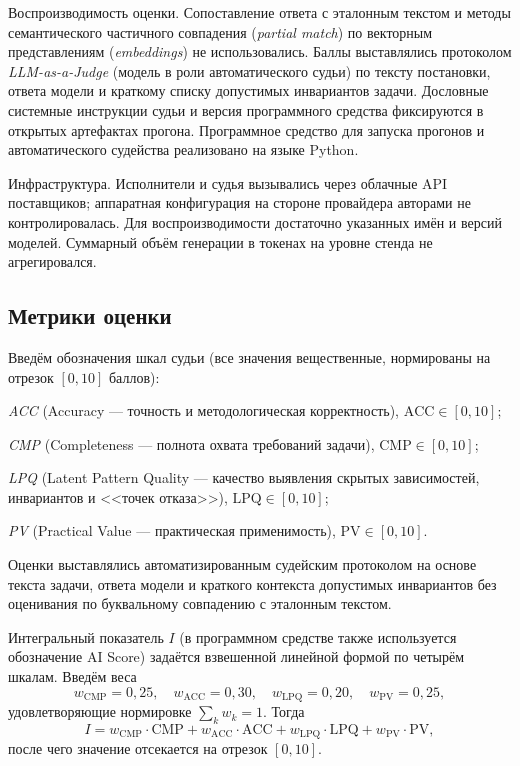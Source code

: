 \documentclass[a4paper,12pt]{article}
\begin{document}
Воспроизводимость оценки. Сопоставление ответа с эталонным текстом и методы семантического частичного совпадения (\textit{partial match}) по векторным представлениям (\textit{embeddings}) не использовались. Баллы выставлялись протоколом \textit{LLM-as-a-Judge} (модель в роли автоматического судьи) по тексту постановки, ответа модели и краткому списку допустимых инвариантов задачи. Дословные системные инструкции судьи и версия программного средства фиксируются в открытых артефактах прогона. Программное средство для запуска прогонов и автоматического судейства реализовано на языке Python.

Инфраструктура. Исполнители и судья вызывались через облачные API поставщиков; аппаратная конфигурация на стороне провайдера авторами не контролировалась. Для воспроизводимости достаточно указанных имён и версий моделей. Суммарный объём генерации в токенах на уровне стенда не агрегировался.

\subsection{Метрики оценки}

Введём обозначения шкал судьи (все значения вещественные, нормированы на отрезок $[0,10]$ баллов):

\textit{ACC} (Accuracy --- точность и методологическая корректность), $\mathrm{ACC}\in[0,10]$;

\textit{CMP} (Completeness --- полнота охвата требований задачи), $\mathrm{CMP}\in[0,10]$;

\textit{LPQ} (Latent Pattern Quality --- качество выявления скрытых зависимостей, инвариантов и <<точек отказа>>), $\mathrm{LPQ}\in[0,10]$;

\textit{PV} (Practical Value --- практическая применимость), $\mathrm{PV}\in[0,10]$.

Оценки выставлялись автоматизированным судейским протоколом на основе текста задачи, ответа модели и краткого контекста допустимых инвариантов без оценивания по буквальному совпадению с эталонным текстом.

Интегральный показатель $I$ (в программном средстве также используется обозначение AI Score) задаётся взвешенной линейной формой по четырём шкалам. Введём веса
\[
w_{\text{CMP}}=0{,}25,\quad w_{\text{ACC}}=0{,}30,\quad w_{\text{LPQ}}=0{,}20,\quad w_{\text{PV}}=0{,}25,
\]
удовлетворяющие нормировке $\sum_{k} w_k = 1$. Тогда
\[
I = w_{\text{CMP}}\cdot \mathrm{CMP} + w_{\text{ACC}}\cdot \mathrm{ACC} + w_{\text{LPQ}}\cdot \mathrm{LPQ} + w_{\text{PV}}\cdot \mathrm{PV},
\]
после чего значение отсекается на отрезок $[0,10]$.
\end{document}
